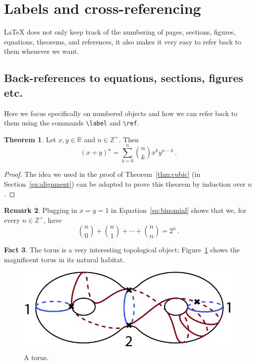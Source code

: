 \documentclass[11pt,letterpaper,titlepage]{article}
\numberwithin{equation}{section}
\numberwithin{figure}{section}
\numberwithin{table}{section}
\numberwithin{algorithm}{section}
\theoremstyle{definition}
\newtheorem{theorem}{Theorem}[section] %
\newtheorem{fact}[theorem]{Fact} %
\newtheorem{remark}[theorem]{Remark}
\newcommand{\ZZ}{\mathbb{Z}}
\newcommand{\RR}{\mathbb{R}}
\begin{document}
\section{Labels and cross-referencing}

{\LaTeX} does not only keep track of the numbering of pages, sections, figures, equations, theorems, and references, it also makes it very easy to refer back to them whenever we want.

\subsection{Back-references to equations, sections, figures etc.}
Here we focus specifically on numbered objects and how we can refer back to them using the commands \verb$\label$ and \verb$\ref$.

\begin{theorem}
    \label{thm:binomial}
    Let $x,y\in\RR$ and $n\in\ZZ^+$. Then
    \begin{equation}
        \label{eq:binomial}
        (x+y)^n=\sum_{k=0}^n\binom{n}{k}x^ky^{n-k}\,.
    \end{equation}
\end{theorem}

\begin{proof}
    The idea we used in the proof of Theorem~\ref{thm:cubic} (in Section~\ref{su:alignment}) can be adapted to prove this theorem by induction over $n$.
\end{proof}

\begin{remark}
Plugging in $x=y=1$ in Equation~\ref{eq:binomial} shows that we, for every $n\in\ZZ^+$, have
\[\binom{n}{0}+\binom{n}{1}+\cdots+\binom{n}{n}=2^n\,.\]
\end{remark}

\begin{fact}
    The torus is a very interesting topological object; Figure~\ref{fig:torus} shows the magnificent torus in its natural habitat.
\end{fact}

\begin{figure}[H]
    \centering
    \includegraphics[width=0.3\linewidth]{torus}
    \caption{A torus.}
    \label{fig:torus}
\end{figure}
\end{document}
